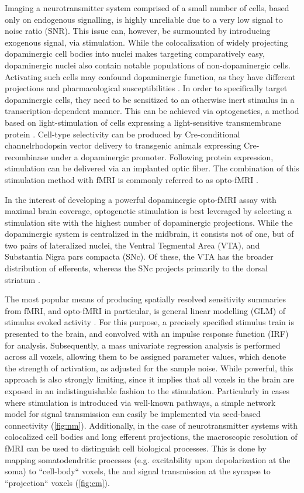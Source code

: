 Imaging a neurotransmitter system comprised of a small number of cells, based only on endogenous signalling, is highly unreliable due to a very low signal to noise ratio (SNR).
This issue can, however, be surmounted by introducing exogenous signal, via stimulation.
While the colocalization of widely projecting dopaminergic cell bodies into nuclei makes targeting comparatively easy, dopaminergic nuclei also contain notable populations of non-dopaminergic cells.
Activating such cells may confound dopaminergic function, as they have different projections and pharmacological susceptibilities \cite{Taylor2014}.
In order to specifically target dopaminergic cells, they need to be sensitized to an otherwise inert stimulus in a transcription-dependent manner.
This can be achieved via optogenetics, a method based on light-stimulation of cells expressing a light-sensitive transmembrane protein \cite{Boyden2005}.
Cell-type selectivity can be produced by Cre-conditional channelrhodopsin vector delivery \cite{Orban1992} to transgenic animals expressing Cre-recombinase under a dopaminergic promoter.
Following protein expression, stimulation can be delivered via an implanted optic fiber.
The combination of this stimulation method with fMRI is commonly referred to as opto-fMRI \cite{Desai2011,Grandjean2019}.

In the interest of developing a powerful dopaminergic opto-fMRI assay with maximal brain coverage, optogenetic stimulation is best leveraged by selecting a stimulation site with the highest number of dopaminergic projections.
While the dopaminergic system is centralized in the midbrain, it consists not of one, but of two pairs of lateralized nuclei, the Ventral Tegmental Area (VTA), and Substantia Nigra pars compacta (SNc).
Of these, the VTA has the broader distribution of efferents, whereas the SNc projects primarily to the dorsal striatum \cite{Pan2010}.

The most popular means of producing spatially resolved sensitivity summaries from fMRI, and opto-fMRI in particular, is general linear modelling (GLM) of stimulus evoked activity \cite{Friston1995}.
For this purpose, a precisely specified stimulus train is presented to the brain, and convolved with an impulse response function (IRF) for analysis.
Subsequently, a mass univariate regression analysis is performed across all voxels, allowing them to be assigned parameter values, which denote the strength of activation, as adjusted for the sample noise.
While powerful, this approach is also strongly limiting, since it implies that all voxels in the brain are exposed in an indistinguishable fashion to the stimulation.
Particularly in cases where stimulation is introduced via well-known pathways, a simple network model for signal transmission can easily be implemented via seed-based connectivity (\cref{fig:nm}).
Additionally, in the case of neurotransmitter systems with colocalized cell bodies and long efferent projections, the macroscopic resolution of fMRI can be used to distinguish cell biological processes.
This is done by mapping somatodendritic processes (e.g. excitability upon depolarization at the soma) to “cell-body“ voxels, the and signal transmission at the synapse to “projection“ voxels (\cref{fig:cm}).

